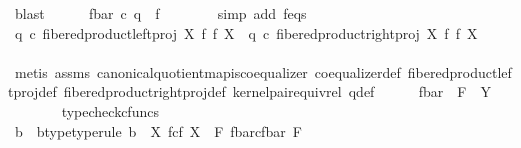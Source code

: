\begin{isabellebody}
\ blast\isanewline
\ \ \ \ \isamarkupfalse%
\ {\isachardoublequoteopen}f{\isacharunderscore}{\kern0pt}bar\ {\isasymcirc}\isactrlsub c\ q\ {\isacharequal}{\kern0pt}\ f{\isachardoublequoteclose}\isanewline
\ \ \ \ \ \ \isamarkupfalse%
\ {\isacharparenleft}{\kern0pt}simp\ add{\isacharcolon}{\kern0pt}\ f{\isacharunderscore}{\kern0pt}eqs{\isacharparenright}{\kern0pt}\isanewline
\ \ \ \ \isamarkupfalse%
\ {\isachardoublequoteopen}q\ {\isasymcirc}\isactrlsub c\ fibered{\isacharunderscore}{\kern0pt}product{\isacharunderscore}{\kern0pt}left{\isacharunderscore}{\kern0pt}proj\ X\ f\ f\ X\ {\isacharequal}{\kern0pt}\ q\ {\isasymcirc}\isactrlsub c\ fibered{\isacharunderscore}{\kern0pt}product{\isacharunderscore}{\kern0pt}right{\isacharunderscore}{\kern0pt}proj\ X\ f\ f\ X{\isachardoublequoteclose}\isanewline
\ \ \ \ \ \ \isamarkupfalse%
\ {\isacharparenleft}{\kern0pt}metis\ assms{\isacharparenleft}{\kern0pt}{}{\isacharparenright}{\kern0pt}\ canonical{\isacharunderscore}{\kern0pt}quotient{\isacharunderscore}{\kern0pt}map{\isacharunderscore}{\kern0pt}is{\isacharunderscore}{\kern0pt}coequalizer\ coequalizer{\isacharunderscore}{\kern0pt}def\ fibered{\isacharunderscore}{\kern0pt}product{\isacharunderscore}{\kern0pt}left{\isacharunderscore}{\kern0pt}proj{\isacharunderscore}{\kern0pt}def\ fibered{\isacharunderscore}{\kern0pt}product{\isacharunderscore}{\kern0pt}right{\isacharunderscore}{\kern0pt}proj{\isacharunderscore}{\kern0pt}def\ kernel{\isacharunderscore}{\kern0pt}pair{\isacharunderscore}{\kern0pt}equiv{\isacharunderscore}{\kern0pt}rel\ q{\isacharunderscore}{\kern0pt}def{\isacharparenright}{\kern0pt}\isanewline
\ \ \ \ \isamarkupfalse%
\ {\isachardoublequoteopen}f{\isacharunderscore}{\kern0pt}bar\ {\isacharcolon}{\kern0pt}\ F\ {\isasymrightarrow}\ Y{\isachardoublequoteclose}\ \isanewline
\ \ \ \ \ \ \isamarkupfalse%
\ typecheck{\isacharunderscore}{\kern0pt}cfuncs\isanewline
\ \ \isamarkupfalse%
\isanewline
\isanewline
\ \ \isanewline
\ \ \isanewline
\ \ \isamarkupfalse%
\ \isamarkupfalse%
\ b\ \ b{\isacharunderscore}{\kern0pt}type{\isacharbrackleft}{\kern0pt}type{\isacharunderscore}{\kern0pt}rule{\isacharbrackright}{\kern0pt}{\isacharcolon}{\kern0pt}\ {\isachardoublequoteopen}b\ {\isacharcolon}{\kern0pt}\ X\ \isactrlbsub f\isactrlesub {\isasymtimes}\isactrlsub c\isactrlbsub f\isactrlesub \ X\ {\isasymrightarrow}\ F\ \isactrlbsub {\isacharparenleft}{\kern0pt}f{\isacharunderscore}{\kern0pt}bar{\isacharparenright}{\kern0pt}\isactrlesub {\isasymtimes}\isactrlsub c\isactrlbsub {\isacharparenleft}{\kern0pt}f{\isacharunderscore}{\kern0pt}bar{\isacharparenright}{\kern0pt}\isactrlesub \ F{\isachardoublequoteclose}\ \isanewline

\end{isabellebody}
